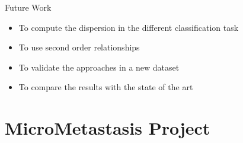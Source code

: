 \documentclass[usenames,dvipsnames]{beamer}
\begin{document}
\begin{frame}{Future Work}

\begin{itemize}
    \item To compute the dispersion in the different classification task
    \item To use second order relationships
    \item To validate the approaches in a new dataset
    \item To compare the results with the state of the art
     
\end{itemize}
    
\end{frame}

\section{MicroMetastasis Project}

\end{document}

